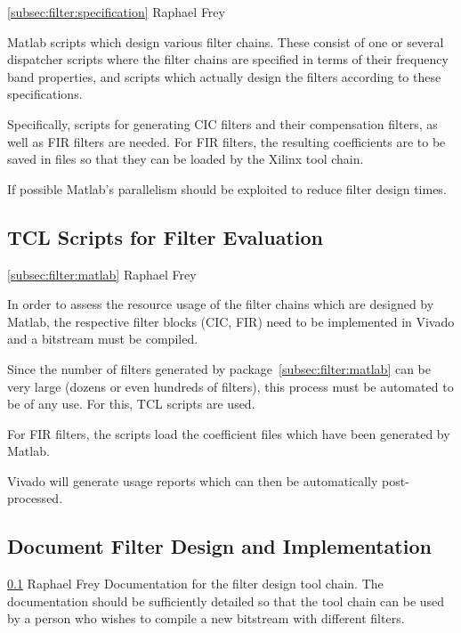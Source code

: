 \documentclass[a4paper,oneside]{alpenspecs/alpenspecs}
\begin{document}
\wpac
    {}
    {}
    {}
    {\ref{subsec:filter:specification}}
    {}
    {Raphael Frey}
    {%
        Matlab scripts which design various filter chains. These consist of one
        or several dispatcher scripts where the filter chains are specified in
        terms of their frequency band properties, and scripts which actually
        design the filters according to these specifications.

        Specifically, scripts for generating CIC filters and their compensation
        filters, as well as FIR filters are needed. For FIR filters, the resulting
        coefficients are to be saved in files so that they can be loaded by the
        Xilinx tool chain.

        If possible Matlab's parallelism should be exploited to reduce filter
        design times.
    }

\subsection{TCL Scripts for Filter Evaluation}
\label{subsec:filter:tcl}

\wpac
    {}
    {}
    {}
    {\ref{subsec:filter:matlab}}
    {}
    {Raphael Frey}
    {%
    In order to assess the resource usage of the filter chains which are
    designed by Matlab, the respective filter blocks (CIC, FIR) need to be
    implemented in Vivado and a bitstream must be compiled.

    Since the number of filters generated by package~\ref{subsec:filter:matlab}
    can be very large (dozens or even hundreds of filters), this process must be automated
    to be of any use. For this, TCL scripts are used.

    For FIR filters, the scripts load the coefficient files which have been
    generated by Matlab.

    Vivado will  generate usage  reports which  can then  be automatically
    post-processed.
    }


\subsection{Document Filter Design and Implementation}
\label{subsec:filter:doc}

\wpac
    {}
    {}
    {}
    {\ref{subsec:filter:tcl}}
    {}
    {Raphael Frey}
    {%
        Documentation  for the  filter design  tool chain. The  documentation
        should be sufficiently detailed so that the tool chain can be used by
        a  person  who wishes  to  compile  a  new bitstream  with  different
        filters.
    }
\end{document}
